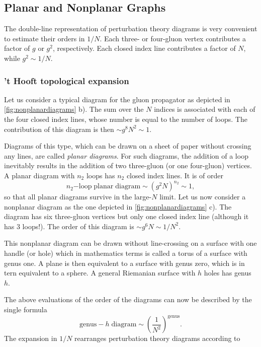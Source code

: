 \subsection{Planar and Nonplanar Graphs}
The double-line representation of perturbation theory diagrams is very
convenient to estimate their orders in $1/N$. Each three- or four-gluon vertex
contributes a factor of $g$ or $g^2$, respectively. Each closed index line
contributes a factor of $N$, while $g^2\sim 1/N$.
\subsubsection{'t Hooft topological expansion}
Let us consider a typical diagram for the gluon propagator as depicted in
\ref{fig:nonplanardiagrams} b). The sum over the $N$ indices is associated with
each of the four closed index lines, whose number is equal to the number of
loops. The contribution of this diagram is then $\sim g^8N^2\sim 1$.
\par Diagrams of this type, which can be drawn on a sheet of paper without
crossing any lines, are called \textit{planar diagrams}. For such diagrams, the
addition of a loop inevitably results in the addition of two three-gluon (or
one four-gluon) vertices. A planar diagram with $n_2$ loops has $n_2$ closed
index lines. It is of order
\begin{equation}
  n_2\mathrm{-loop}\;\mathrm{planar}\;\mathrm{diagram}\sim(g^2N)^{n_2}\sim 1,
\end{equation}
so that all planar diagrams survive in the large-$N$ limit. Let us now consider
a nonplanar diagram as the one depicted in \ref{fig:nonplanardiagrams} c). The
diagram has six three-gluon vertices but only one closed index line (although
it has 3 loops!). The order of this diagram is $\sim g^6N\sim 1/N^2$.
\par This nonplanar diagram can be drawn without line-crossing on a surface
with one handle (or hole) which in mathematics terms is called a torus of
a surface with genus one. A plane is then equivalent to a surface with genus
zero, which is in tern equivalent to a sphere. A general Riemanian surface with
$h$ holes has genus $h$.
\par The above evaluations of the order of the diagrams can now be described by
the single formula
\begin{equation}
  \mathrm{genus}-h\;\mathrm{diagram} \sim \left(\frac{1}{N^2}\right)^{\mathrm{genus}}.
  \label{eq:genusformula}
\end{equation}
The expansion in $1/N$ rearranges perturbation theory diagrams according to
